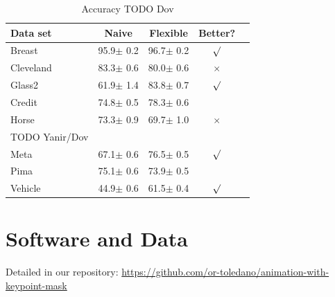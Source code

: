 \documentclass{article}
\begin{document}
\begin{table}[t]
\caption{Accuracy TODO Dov}
\label{sample-table}
\vskip 0.15in
\begin{center}
\begin{small}
\begin{sc}
\begin{tabular}{lcccr}
\toprule
Data set & Naive & Flexible & Better? \\
\midrule
Breast    & 95.9$\pm$ 0.2& 96.7$\pm$ 0.2& $\surd$ \\
Cleveland & 83.3$\pm$ 0.6& 80.0$\pm$ 0.6& $\times$\\
Glass2    & 61.9$\pm$ 1.4& 83.8$\pm$ 0.7& $\surd$ \\
Credit    & 74.8$\pm$ 0.5& 78.3$\pm$ 0.6&         \\
Horse     & 73.3$\pm$ 0.9& 69.7$\pm$ 1.0& $\times$\\
TODO Yanir/Dov
\\
Meta      & 67.1$\pm$ 0.6& 76.5$\pm$ 0.5& $\surd$ \\
Pima      & 75.1$\pm$ 0.6& 73.9$\pm$ 0.5&         \\
Vehicle   & 44.9$\pm$ 0.6& 61.5$\pm$ 0.4& $\surd$ \\
\bottomrule
\end{tabular}
\end{sc}
\end{small}
\end{center}
\vskip -0.1in
\end{table}

\section*{Software and Data}
Detailed in our repository:
{\footnotesize
\url{https://github.com/or-toledano/animation-with-keypoint-mask}
}



\end{document}
